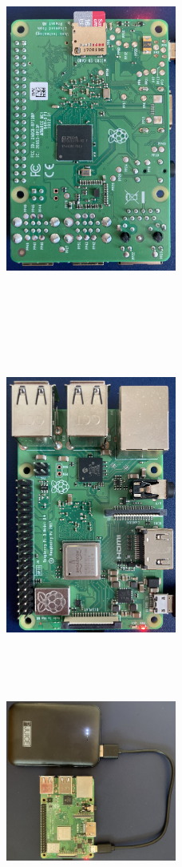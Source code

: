 \documentclass[a4paper]{article}
\begin{document}
\begin{figure}
    \includegraphics[width=0.5\textwidth, height = 12cm]{images/hardware/Raspberry3.jpg}
    \includegraphics[width=0.5\textwidth, height = 12cm]{images/hardware/Raspberry2.jpg}
    \includegraphics[width=0.5\textwidth, height = 6cm]{images/hardware/Raspberry1.jpg}

\end{figure}
\end{document}
